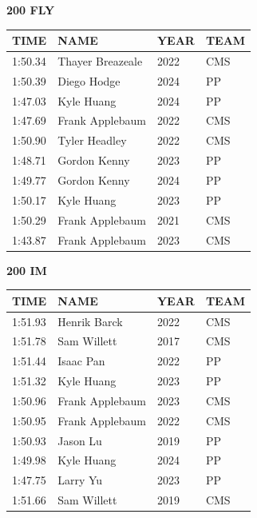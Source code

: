 \begin{table}[H]
\centering
\begin{minipage}[t]{0.48\textwidth}
\centering
\textbf{200 FLY}\\[0.1cm]
\begin{tabular}{@{}p{1.8cm}p{2.8cm}p{1.2cm}p{1.4cm}@{}}
\hline
    \textbf{TIME} & \textbf{NAME} & \textbf{YEAR} & \textbf{TEAM} \\
\hline
    1:50.34 & Thayer Breazeale & 2022 & CMS \\
    1:50.39 & Diego Hodge & 2024 & PP \\
    1:47.03 & Kyle Huang & 2024 & PP \\
    1:47.69 & Frank Applebaum & 2022 & CMS \\
    1:50.90 & Tyler Headley & 2022 & CMS \\
    1:48.71 & Gordon Kenny & 2023 & PP \\
    1:49.77 & Gordon Kenny & 2024 & PP \\
    1:50.17 & Kyle Huang & 2023 & PP \\
    1:50.29 & Frank Applebaum & 2021 & CMS \\
    1:43.87 & Frank Applebaum & 2023 & CMS \\
\hline
\end{tabular}
\end{minipage}\hfill
\begin{minipage}[t]{0.48\textwidth}
\centering
\textbf{200 IM}\\[0.1cm]
\begin{tabular}{@{}p{1.8cm}p{2.8cm}p{1.2cm}p{1.4cm}@{}}
\hline
    \textbf{TIME} & \textbf{NAME} & \textbf{YEAR} & \textbf{TEAM} \\
\hline
    1:51.93 & Henrik Barck & 2022 & CMS \\
    1:51.78 & Sam Willett & 2017 & CMS \\
    1:51.44 & Isaac Pan & 2022 & PP \\
    1:51.32 & Kyle Huang & 2023 & PP \\
    1:50.96 & Frank Applebaum & 2023 & CMS \\
    1:50.95 & Frank Applebaum & 2022 & CMS \\
    1:50.93 & Jason Lu & 2019 & PP \\
    1:49.98 & Kyle Huang & 2024 & PP \\
    1:47.75 & Larry Yu & 2023 & PP \\
    1:51.66 & Sam Willett & 2019 & CMS \\
\hline
\end{tabular}
\end{minipage}
\end{table}

